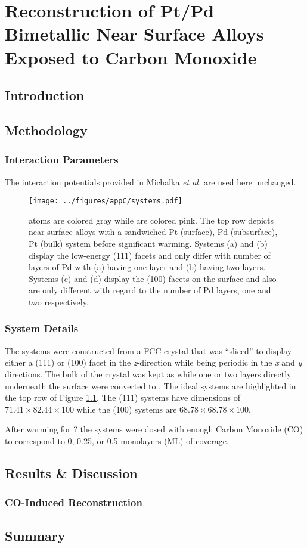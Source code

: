 
\chapter{Reconstruction of Pt/Pd Bimetallic Near Surface Alloys Exposed to Carbon Monoxide}


\section{Introduction}

\section{Methodology}

\subsection{Interaction Parameters}
The interaction potentials provided in Michalka {\em et
al.}\cite{Michalka:2015aa} are used here unchanged.


\begin{landscape}
\begin{figure}[p!]
\centering
  \texttt{[image: ../figures/appC/systems.pdf]}
  \caption{ atoms are colored gray while  are colored pink. The
top row depicts near surface alloys with a sandwiched Pt (surface), Pd
(subsurface), Pt (bulk) system before significant warming. Systems (a) and (b)
display the low-energy (111) facets and only differ with number of layers of Pd
with (a) having one layer and (b) having two layers. Systems (c) and (d)
display the (100) facets on the surface and also are only different with regard
to the number of Pd layers, one and two respectively.}
\label{fig:biSystems}
\end{figure}
\end{landscape}

\subsection{System Details}
The systems were constructed from a FCC  crystal that was ``sliced'' to
display either a (111) or (100) facet in the {\em z}-direction while being
periodic in the {\em x} and {\em y} directions. The bulk of the crystal was
kept as  while one or two layers directly underneath the surface were
converted to . The ideal systems are highlighted in the top row of
Figure \ref{fig:biSystems}. The (111) systems have dimensions of $71.41\times82.44\times100$ while the (100) systems are $68.78\times68.78\times100$.

After warming for ? the systems were dosed with enough Carbon Monoxide (CO) to correspond to 0, 0.25, or 0.5 monolayers (ML) of coverage.




\section{Results \& Discussion}

\subsection{CO-Induced Reconstruction}

\section{Summary}
